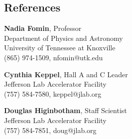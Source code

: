 \documentclass[12pt,letterpaper]{article}
\begin{document}
\subsection*{References}
\begin{multicols}{2}
	{\noindent\bf{Nadia Fomin}}, Professor\\
	Department of Physics and Astronomy\\ 
	University of Tennessee at Knoxville\\
	(865) 974-1509, nfomin@utk.edu\\
	\columnbreak
	
	{\noindent\bf{Cynthia Keppel}}, Hall A and C Leader\\
	Jefferson Lab Accelerator Facility\\
	(757) 584-7580, keppel@jlab.org\\
\end{multicols}
	{\noindent\bf{Douglas Higinbotham}}, Staff Scientist\\
	Jefferson Lab Accelerator Facility\\
	(757) 584-7851, doug@jlab.org\\

		

	

\iffalse
\hrule

\subsection*{Interests}

	Football, coaching, programming, boating, traveling,
\fi
\end{document}
